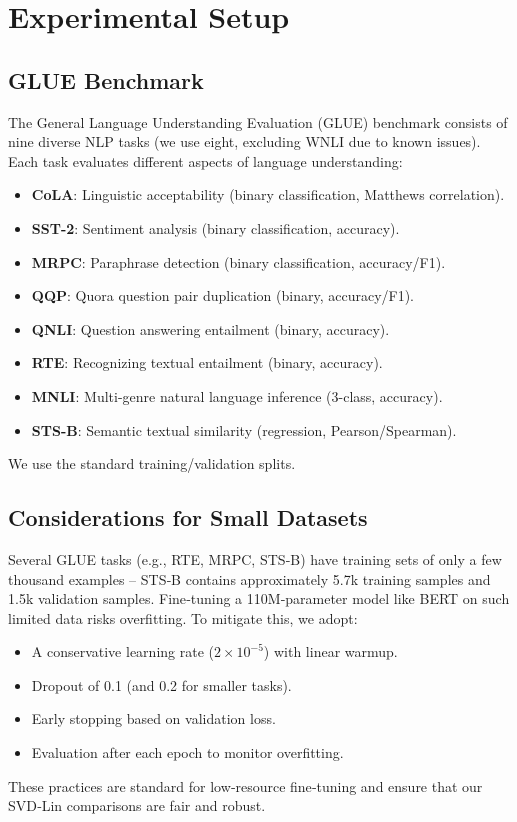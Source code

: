 \section{Experimental Setup}
\subsection{GLUE Benchmark}
The General Language Understanding Evaluation (GLUE) benchmark \cite{wang2018glue} consists of nine diverse NLP tasks (we use eight, excluding WNLI due to known issues). Each task evaluates different aspects of language understanding:
\begin{itemize}
    \item \textbf{CoLA}: Linguistic acceptability (binary classification, Matthews correlation).
    \item \textbf{SST-2}: Sentiment analysis (binary classification, accuracy).
    \item \textbf{MRPC}: Paraphrase detection (binary classification, accuracy/F1).
    \item \textbf{QQP}: Quora question pair duplication (binary, accuracy/F1).
    \item \textbf{QNLI}: Question answering entailment (binary, accuracy).
    \item \textbf{RTE}: Recognizing textual entailment (binary, accuracy).
    \item \textbf{MNLI}: Multi-genre natural language inference (3-class, accuracy).
    \item \textbf{STS-B}: Semantic textual similarity (regression, Pearson/Spearman).
\end{itemize}
We use the standard training/validation splits.
\subsection{Considerations for Small Datasets}
Several GLUE tasks (e.g., RTE, MRPC, STS‑B) have training sets of only a few thousand examples – STS‑B contains approximately 5.7k training samples and 1.5k validation samples. Fine‑tuning a 110M‑parameter model like BERT on such limited data risks overfitting. To mitigate this, we adopt:
\begin{itemize}
    \item A conservative learning rate ($2\times10^{-5}$) with linear warmup.
    \item Dropout of 0.1 (and 0.2 for smaller tasks).
    \item Early stopping based on validation loss.
    \item Evaluation after each epoch to monitor overfitting.
\end{itemize}
These practices are standard for low‑resource fine‑tuning and ensure that our SVD‑Lin comparisons are fair and robust.

